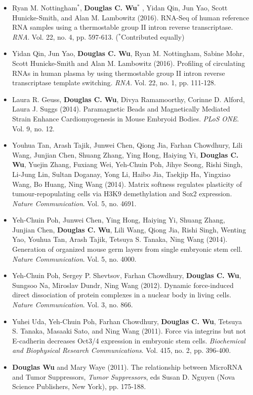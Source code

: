 \documentclass[dvips,11pt]{article}
\begin{document}
\begin{itemize}
	\setlength{\itemsep}{2pt}
	\item Ryan M. Nottingham$^*$, {\bf Douglas C. Wu$^*$} , Yidan Qin, Jun Yao, Scott Hunicke-Smith, and Alan M. Lambowitz (2016). RNA-Seq of human reference RNA samples using a thermostable group II intron reverse transcriptase. {\it RNA}. Vol. 22, no. 4, pp. 597-613. ($^*$Contributed equally)
	\item Yidan Qin, Jun Yao, {\bf Douglas C. Wu}, Ryan M. Nottingham, Sabine Mohr, Scott Hunicke-Smith and Alan M. Lambowitz (2016). Profiling of circulating RNAs in human plasma by using thermostable group II intron reverse transcriptase template switching. {\it RNA}. Vol. 22, no. 1, pp. 111-128.
	\item Laura R. Geuss, {\bf Douglas C. Wu}, Divya Ramamoorthy, Corinne D. Alford, Laura J. Suggs (2014). Paramagnetic Beads and Magnetically Mediated Strain Enhance Cardiomyogenesis in Mouse Embryoid Bodies. {\it PLoS ONE}. Vol. 9, no. 12.
	\item Youhua Tan, Arash Tajik, Junwei Chen, Qiong Jia, Farhan Chowdhury, Lili Wang, Junjian Chen, Shuang Zhang, Ying Hong, Haiying Yi, {\bf Douglas C. Wu}, Yuejin Zhang, Fuxiang Wei, Yeh-Chuin Poh, Jihye Seong, Rishi Singh, Li-Jung Lin, Sultan Doganay, Yong Li, Haibo Jia, Taekjip Ha, Yingxiao Wang, Bo Huang, Ning Wang (2014). Matrix softness regulates plasticity of tumour-repopulating cells via H3K9 demethylation and Sox2 expression. {\it Nature Communication}. Vol. 5, no. 4691.
	\item Yeh-Chuin Poh, Junwei Chen, Ying Hong, Haiying Yi, Shuang Zhang, Junjian Chen, {\bf Douglas C. Wu}, Lili Wang, Qiong Jia, Rishi Singh, Wenting Yao, Youhua Tan, Arash Tajik, Tetsuya S. Tanaka, Ning Wang (2014). Generation of organized mouse germ layers from single embryonic stem cell. {\it Nature Communication}. Vol. 5, no. 4000.
	\item Yeh-Chuin Poh, Sergey P. Shevtsov, Farhan Chowdhury, { \bf Douglas C. Wu}, Sungsoo Na, Miroslav Dundr, Ning Wang (2012). Dynamic force-induced direct dissociation of protein complexes in a nuclear body in living cells. {\it Nature Communication}. Vol. 3, no. 866.
	\item Yuhei Uda, Yeh-Chuin Poh, Farhan Chowdhury, { \bf Douglas C. Wu}, Tetsuya S. Tanaka, Masaaki Sato, and Ning Wang (2011). Force via integrins but not E-cadherin decreases Oct3/4 expression in embryonic stem cells. {\it Biochemical and Biophysical Research Communications}. Vol. 415, no. 2, pp. 396-400.
	\item {\bf Douglas Wu} and Mary Waye (2011). The relationship between MicroRNA and Tumor Suppressors, {\it Tumor Suppressors}, eds Susan D. Nguyen (Nova Science Publishers, New York), pp. 175-188.
\end{itemize}
\end{document}

